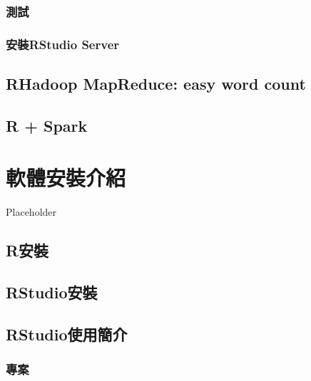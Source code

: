 \documentclass[
]{book}
\begin{document}
\hypertarget{ux6e2cux8a66}{%
\subsection{測試}\label{ux6e2cux8a66}}

\hypertarget{ux5b89ux88ddrstudio-server}{%
\subsection{安裝RStudio Server}\label{ux5b89ux88ddrstudio-server}}

\hypertarget{rhadoop-mapreduce-easy-word-count}{%
\section{RHadoop MapReduce: easy word count}\label{rhadoop-mapreduce-easy-word-count}}

\hypertarget{r-spark}{%
\section{R + Spark}\label{r-spark}}

\hypertarget{install}{%
\chapter{軟體安裝介紹}\label{install}}

Placeholder

\hypertarget{rux5b89ux88dd}{%
\section{R安裝}\label{rux5b89ux88dd}}

\hypertarget{rstudioux5b89ux88dd}{%
\section{RStudio安裝}\label{rstudioux5b89ux88dd}}

\hypertarget{rstudioux4f7fux7528ux7c21ux4ecb}{%
\section{RStudio使用簡介}\label{rstudioux4f7fux7528ux7c21ux4ecb}}

\hypertarget{ux5c08ux6848}{%
\subsection{專案}\label{ux5c08ux6848}}
\end{document}
